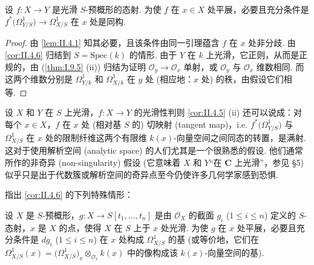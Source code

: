 \begin{corollary}\label{cor:II.4.6}
设 $f \colon X \to Y$ 是光滑 $S$-预概形的态射. 为使 $f$ 在 $x \in X$ 处平展，必要且充分条件是 $f^{*}\bigl(\varOmega_{Y/S}^{1}\bigr) \to \varOmega_{X/S}^{1}$ 在 $x$ 处是同构.
\end{corollary}

\begin{proof}
由 \ref{lem:II.4.1} 知其必要，且该条件由同一引理蕴含 $f$ 在 $x$ 处非分歧. 由 \ref{cor:II.4.6} 归结到 $S = \mathrm{Spec}(k)$ 的情形. 由于 $Y$ 在 $k$ 上光滑，它正则，从而是正规的，由 (\ref{thm:I.9.5} (ii)) 归结为证明 $\mathcal{O}_y \to \mathcal{O}_x$ 单射，或 $\mathcal{O}_y$ 与 $\mathcal{O}_x$ 维数相同. 而这两个维数分别是 $\varOmega_{Y/k}^{1}$ 和 $\varOmega_{X/k}^{1}$ 在 $y$ 处 (相应地：$x$ 处) 的秩，由假设它们相等.
\end{proof}

\begin{remark}\label{rem:II.4.7}
设 $X$ 和 $Y$ 在 $S$ 上光滑，$f \colon X \to Y$ 的光滑性判则 \ref{cor:II.4.5} (ii) 还可以说成：对每个 $x \in X$，$f$ 在 $x$ 处 (相对基 $S$ 的) 切映射 (tangent map)，i.e. $f^{*}\bigl(\varOmega_{Y/S}^{1}\bigr)$ 与 $\varOmega_{X/S}^{1}$ 在 $x$ 处的限制纤维这两个有限维 $k(x)$-向量空间之间同态的转置，是满射. 这对于使用解析空间 (analytic space) 的人们尤其是一个很熟悉的假设. 他们通常所作的非奇异 (non-singularity) 假设 (它意味着 $X$ 和 $Y$``在 $\mathbf{C}$ 上光滑''，参见 §5) 似乎只是出于代数簇或解析空间的奇异点至今仍使许多几何学家感到恐惧.
\end{remark}

指出 \ref{cor:II.4.6} 的下列特殊情形：

\begin{corollary}\label{cor:II.4.8}
设 $X$ 是 $S$-预概形，$g \colon X \to S[t_1, \dots, t_n]$ 是由 $\mathcal{O}_X$ 的截面 $g_i$ ($1 \leqslant i \leqslant n$) 定义的 $S$-态射，$x$ 是 $X$ 的点，使得 $X$ 在 $S$ 上于 $x$ 处光滑. 为使 $g$ 在 $x$ 处平展，必要且充分条件是 $dg_i$ ($1 \leqslant i \leqslant n$) 在 $x$ 处构成 $\varOmega_{X/S}^{1}$ 的基 (或等价地，它们在 $\varOmega_{X/S}^{1}(x) = \bigl(\varOmega_{X/S}^{1}\bigr)_x \otimes_{\mathcal{O}_x} k(x)$ 中的像构成该 $k(x)$-向量空间的基).
\end{corollary}

